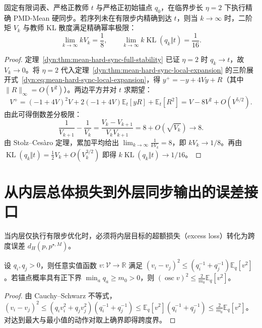 \documentclass[lang=cn,scheme=chinese,openany]{elegantbook}
\newcommand{\E}{\mathbb E}
\newcommand{\KL}{\operatorname{KL}}
\newcommand{\R}{\mathbb R}
\begin{document}
\begin{theorem}[PMD-Mean 在临界边界步长 $\eta=2$ 处的 $1/(16k)$ 渐近幂率]
\label{dyn:thm:mean-hard-sync-boundary-rate}
固定有限词表、严格正教师 $t$ 与严格正初始锚点 $q_0$，在临界步长 $\eta=2$ 下执行精确 PMD-Mean 硬同步。若序列未在有限步内精确到达 $t$，则当 $k\to\infty$ 时，二阶矩 $V_k$ 与教师 KL 散度满足精确幂率极限：
\begin{equation}
 \lim_{k\to\infty} k V_k=\frac18,
 \qquad \lim_{k\to\infty} k\KL(q_k\Vert t)=\frac1{16}.
 \label{dyn:eq:mean-hard-sync-boundary-rate}
\end{equation}
\end{theorem}
\begin{proof}
定理~\ref{dyn:thm:mean-hard-sync-full-stability} 已证 $\eta=2$ 时 $q_k\to t$，故 $V_k\to 0$。将 $\eta=2$ 代入定理~\ref{dyn:thm:mean-hard-sync-local-expansion} 的三阶展开式~\eqref{dyn:eq:mean-hard-sync-local-expansion}，得 $y^+=-y+4Vy+R$（其中 $\|R\|_\infty=O(V^2)$）。两边平方并对 $t$ 求期望：
\begin{equation*}
 V^+=(-1+4V)^2 V+2(-1+4V)\E_t[yR]+\E_t[R^2]=V-8V^2+O(V^{5/2}).
\end{equation*}
由此可得倒数差分极限：
\begin{equation*}
 \frac1{V_{k+1}}-\frac1{V_k}=\frac{V_k-V_{k+1}}{V_k V_{k+1}}=8+O(\sqrt{V_k})\longrightarrow 8.
\end{equation*}
由 Stolz--Ces\`aro 定理，累加平均给出 $\lim_{k\to\infty}\frac{1}{k V_k}=8$，即 $k V_k\to 1/8$。再由 $\KL(q_k\Vert t)=\frac12 V_k+O(V_k^{3/2})$ 即得 $k\KL(q_k\Vert t)\to 1/16$。
\end{proof}

\section{从内层总体损失到外层同步输出的误差接口}
\label{dyn:bridges}

当内层仅执行有限步优化时，必须将内层目标的超额损失（excess loss）转化为跨度误差 $d_H(p,p^{\star,M})$。

\begin{lemma}[锚点加权二阶矩控制动作间差值与跨度]
\label{dyn:contrast}
设 $q_i,q_j>0$，则任意实值函数 $v:\mathcal V\to\R$ 满足 $(v_i-v_j)^2\le(q_i^{-1}+q_j^{-1})\E_q[v^2]$。若锚点概率具有正下界 $\min_a q_a\ge m_0>0$，则 $(\operatorname{osc}v)^2\le \frac2{m_0}\E_q[v^2]$。
\end{lemma}
\begin{proof}
由 Cauchy--Schwarz 不等式，$(v_i-v_j)^2\le (q_i v_i^2+q_j v_j^2)(q_i^{-1}+q_j^{-1})\le \E_q[v^2](q_i^{-1}+q_j^{-1})\le \frac2{m_0}\E_q[v^2]$。对达到最大与最小值的动作对取上确界即得跨度界。
\end{proof}
\end{document}
